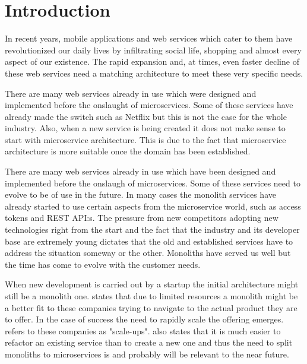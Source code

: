 
\section{Introduction}
\begin{sloppypar}
    In recent years, mobile applications and web services which cater to them have revolutionized our daily lives by infiltrating social life, shopping and almost every aspect of our existence. The rapid expansion and, at times, even faster decline of these web services need a matching architecture to meet these very specific needs.  
\end{sloppypar}
\begin{sloppypar}
    There are many web services already in use which were designed and 
    implemented before the onslaught of microservices. Some of these services 
    have already made the switch such as Netflix but this is not the case for 
    the whole industry. Also, when a new service is being created it does not 
    make sense to start with microservice architecture. This is due to the 
    fact that microservice architecture is more suitable once the domain has 
    been established.
\end{sloppypar}
\begin{sloppypar}
    There are many web services already in use which have been designed and 
    implemented before the onslaugh of microservices. Some of these services 
    need to evolve to be of use in the future. In many cases the monolith 
    services have already started to use certain aspects from the microservice 
    world, such as access tokens and REST API:s. The pressure from new 
    competitors adopting new technologies right from the start and the fact 
    that the industry and its developer base are extremely young dictates that 
    the old and established services have to address the situation someway or 
    the other. Monoliths have served us well but the time has come to evolve 
    with the customer needs.
\end{sloppypar}
\begin{sloppypar}
    When new development is carried out by a startup the initial architecture 
    might still be a monolith one. \citet{newman2019} states that due to limited 
    resources a monolith might be a better fit to these companies trying to 
    navigate to the actual product they are to offer. In the case of success 
    the need to rapidly scale the offering emerges. \citet{newman2019} refers 
    to these companies as "scale-ups". \citet{newman2019} also states that it 
    is much easier to refactor an existing service than to create a new one and
    thus the need to split monoliths to microservices is and probably will be 
    relevant to the near future.
\end{sloppypar}
